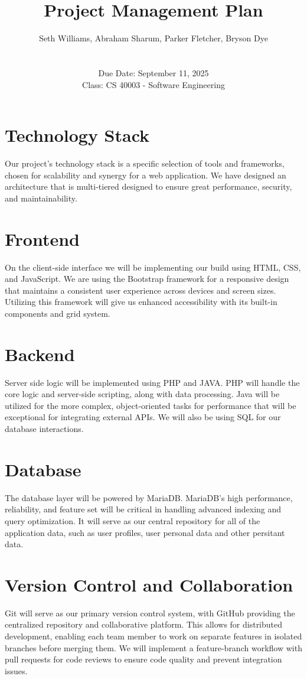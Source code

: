 \documentclass[10pt,titlepage]{article}
\title{Project Management Plan}
\author{Seth Williams, Abraham Sharum, Parker Fletcher, Bryson Dye \\\\ \\ Due Date: September 11, 2025 \\ Class: CS 40003 - Software Engineering}
\begin{document}
	\pagestyle{fancy}
	\fancyfoot{}
	\fancyfoot[CE,CO]{\textbf{\thepage}}
	\maketitle
	
	\section*{Technology Stack}
	Our project's technology stack is a specific selection of tools and frameworks, chosen for scalability and synergy for a web application. We have designed an architecture that is multi-tiered designed to ensure great performance, security, and maintainability.
	
	\section*{Frontend}
	On the client-side interface we will be implementing our build using HTML, CSS, and JavaScript. We are using the Bootstrap framework for a responsive design that maintains a consistent user experience across devices and screen sizes. Utilizing this framework will give us enhanced accessibility with its built-in components and grid system. 
	
	\section*{Backend}
	Server side logic will be implemented using PHP and JAVA. PHP will handle the core logic and server-side scripting, along with data processing. Java will be utilized for the more complex, object-oriented tasks for performance that will be exceptional for integrating external APIs. We will also be using SQL for our database interactions.
	
	\section*{Database}
	The database layer will be powered by MariaDB. MariaDB's high performance, reliability, and feature set will be critical in handling advanced indexing and query optimization. It will serve as our central repository for all of the application data, such as user profiles, user personal data and other persitant data.  
	
	\section*{Version Control and Collaboration}
	Git will serve as our primary version control system, with GitHub providing the centralized repository and collaborative platform. This allows for distributed development, enabling each team member to work on separate features in isolated branches before merging them. We will implement a feature-branch workflow with pull requests for code reviews to ensure code quality and prevent integration issues.
	
\end{document}
